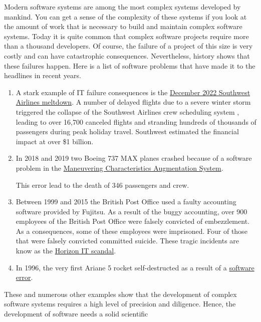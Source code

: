 Modern software systems are among the most complex systems developed by mankind.  You can get a
sense of the complexity of these systems if you look at the amount of work that is necessary to
build and maintain complex software systems.  Today it is quite common that complex software projects require
more than a thousand developers.  Of course, the failure of a project of this size is very costly and can have
catastrophic consequences.  Nevertheless, history shows that these failures happen.
Here is a list of software problems that have made it to the headlines in recent years.
\begin{enumerate}
\item A stark example of IT failure consequences is the
      \href{https://www.npr.org/2023/01/26/1151667801/southwest-airlines-investigation-losses-holiday-travel-cancellations}{December 2022 Southwest Airlines meltdown}.
      A number of delayed flights due to a severe winter storm triggered the collapse of the Southwest Airlines
      crew scheduling system , leading to over 16,700 
      canceled flights and stranding hundreds of thousands of passengers during peak holiday travel. Southwest
      estimated the financial impact at over \$1 billion. 
\item In 2018 and 2019 two Boeing 737 MAX planes crashed because of a software problem in the
      \href{https://en.wikipedia.org/wiki/Maneuvering_Characteristics_Augmentation_System}{Maneuvering
        Characteristics Augmentation System}.
      
      This error lead to the death of 346 passengers and crew.
\item Between 1999 and 2015 the British Post Office used a faulty accounting software provided by Fujitsu.
      As a result of the buggy accounting, over 900 employees of the British Post Office were falsely
      convicted of embezzlement.  As a consequences, some of these employees were imprisoned.  Four of those
      that were falsely convicted committed suicide.  These tragic incidents are know as the
      \href{https://en.wikipedia.org/wiki/British_Post_Office_scandal}{Horizon IT scandal}.     
\item In 1996, the very first Ariane 5 rocket self-destructed as a result of a
      \href{https://www.bugsnag.com/blog/bug-day-ariane-5-disaster/}{software error}. 
\end{enumerate}
These and numerous other examples show that the development of complex software systems requires a high level
of precision and diligence.  Hence, the development of software needs a solid scientific
